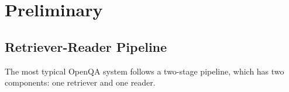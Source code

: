 \section{Preliminary}\label{sec:preliminary}
 









\subsection{Retriever-Reader Pipeline}
The most typical OpenQA system follows a two-stage pipeline, which has two components: one retriever and one reader. 


